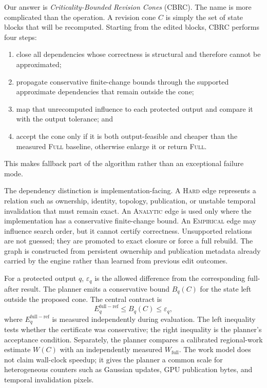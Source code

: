 \documentclass[acmtog,nonacm]{acmart}
\newcommand{\method}{CBRC}
\newcommand{\FULL}{\textsc{Full}}
\newcommand{\hard}{\textsc{Hard}}
\newcommand{\analytic}{\textsc{Analytic}}
\newcommand{\empirical}{\textsc{Empirical}}
\begin{document}
Our answer is \emph{Criticality-Bounded Revision Cones} (\method). The name is more complicated than the operation. A revision cone $C$ is simply the set of state blocks that will be recomputed. Starting from the edited blocks, \method{} performs four steps:
\begin{enumerate}
    \item close all dependencies whose correctness is structural and therefore cannot be approximated;
    \item propagate conservative finite-change bounds through the supported approximate dependencies that remain outside the cone;
    \item map that unrecomputed influence to each protected output and compare it with the output tolerance; and
    \item accept the cone only if it is both output-feasible and cheaper than the measured \FULL{} baseline, otherwise enlarge it or return \FULL{}.
\end{enumerate}
This makes fallback part of the algorithm rather than an exceptional failure mode.

The dependency distinction is implementation-facing. A \hard{} edge represents a relation such as ownership, identity, topology, publication, or unstable temporal invalidation that must remain exact. An \analytic{} edge is used only where the implementation has a conservative finite-change bound. An \empirical{} edge may influence search order, but it cannot certify correctness. Unsupported relations are not guessed; they are promoted to exact closure or force a full rebuild. The graph is constructed from persistent ownership and publication metadata already carried by the engine rather than learned from previous edit outcomes.

For a protected output $q$, $\varepsilon_q$ is the allowed difference from the corresponding full-after result. The planner emits a conservative bound $B_q(C)$ for the state left outside the proposed cone. The central contract is
\begin{equation}
E_q^{\mathrm{full-ref}} \le B_q(C) \le \varepsilon_q,
\label{eq:contract}
\end{equation}
where $E_q^{\mathrm{full-ref}}$ is measured independently during evaluation. The left inequality tests whether the certificate was conservative; the right inequality is the planner's acceptance condition. Separately, the planner compares a calibrated regional-work estimate $W(C)$ with an independently measured $W_{\mathrm{full}}$. The work model does not claim wall-clock speedup; it gives the planner a common scale for heterogeneous counters such as Gaussian updates, GPU publication bytes, and temporal invalidation pixels.
\end{document}
